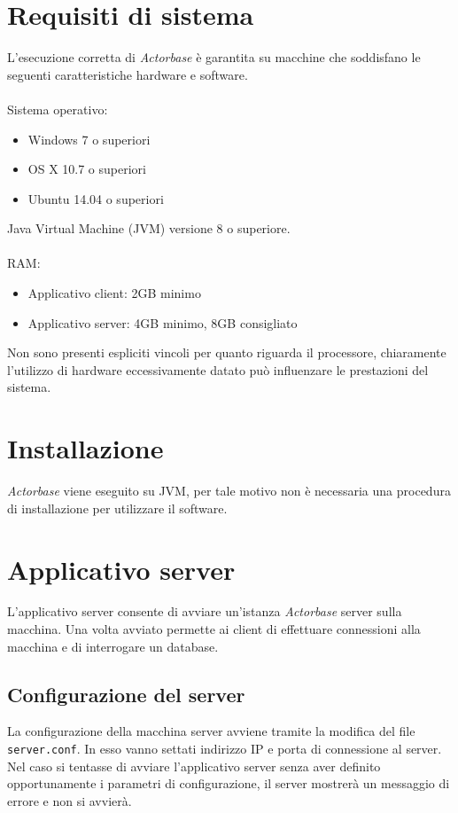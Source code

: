 \documentclass[a4paper]{article}
\begin{document}
	\section{Requisiti di sistema}	
	L'esecuzione corretta di \emph{Actorbase} è garantita su macchine che soddisfano le seguenti caratteristiche hardware e software.
	\\ \\
	Sistema operativo:
	\begin{itemize}
		\item Windows 7 o superiori
		\item OS X 10.7 o superiori
		\item Ubuntu 14.04 o superiori
	\end{itemize}
	Java Virtual Machine (JVM) versione 8 o superiore.
	\\ \\
	RAM:
	\begin{itemize}
		\item Applicativo client: 2GB minimo
		\item Applicativo server: 4GB minimo, 8GB consigliato
	\end{itemize}
	Non sono presenti espliciti vincoli per quanto riguarda il processore, chiaramente l'utilizzo di hardware eccessivamente datato può influenzare le prestazioni del sistema.
	
	\section{Installazione}
	\emph{Actorbase} viene eseguito su JVM, per tale motivo non è necessaria una procedura di installazione per utilizzare il software. 
	\newpage



	\section{Applicativo server}
	L'applicativo server consente di avviare un'istanza \emph{Actorbase} server sulla macchina. Una volta avviato permette ai client di effettuare connessioni alla macchina e di interrogare un database. 
	
	\subsection{Configurazione del server}
	La configurazione della macchina server avviene tramite la modifica del file \texttt{server.conf}. In esso vanno settati indirizzo IP e porta di connessione al server.
	\\
	Nel caso si tentasse di avviare l'applicativo server senza aver definito opportunamente i parametri di configurazione, il server mostrerà un messaggio di errore e non si avvierà.
	
\end{document}
